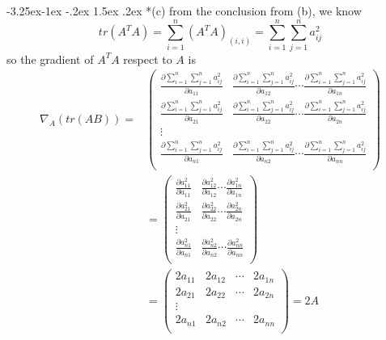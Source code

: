 \documentclass[12pt]{article}
\makeatletter
\renewcommand\subsection{\@startsection{subsection}{2}{\z@}%
	{-3.25ex\@plus -1ex \@minus -.2ex}%
	{1.5ex \@plus .2ex}%
	{\normalfont\large\bfseries}}%
\makeatother
\begin{document}
	\subsection*{(c)}
	from the conclusion from (b), we know
	\begin{equation}\label{aa_ii}
	tr(A^TA)=\sum_{i=1}^n (A^TA)_{(i,i)}=\sum_{i=1}^n\sum_{j=1}^n a_{ij}^2
	\end{equation}
	so the gradient of $A^TA$ respect to $A$ is
	\begin{equation}\label{trAA_grad}
	\begin{split}
	\nabla_A(tr(AB))=&
	\left(  
	\begin{array}{cccc}
	\frac{\partial\sum_{i=1}^n\sum_{j=1}^n a_{ij}^2}{\partial a_{11}} & \frac{\partial\sum_{i=1}^n\sum_{j=1}^n a_{ij}^2}{\partial a_{12}} \cdots \frac{\partial\sum_{i=1}^n\sum_{j=1}^n a_{ij}^2}{\partial a_{1n}}\\
	\frac{\partial\sum_{i=1}^n\sum_{j=1}^n a_{ij}^2}{\partial a_{21}} & \frac{\partial\sum_{i=1}^n\sum_{j=1}^n a_{ij}^2}{\partial a_{22}} \cdots \frac{\partial\sum_{i=1}^n\sum_{j=1}^n a_{ij}^2}{\partial a_{2n}}\\
	\vdots \\
	\frac{\partial\sum_{i=1}^n\sum_{j=1}^n a_{ij}^2}{\partial a_{n1}} & \frac{\partial\sum_{i=1}^n\sum_{j=1}^n a_{ij}^2}{\partial a_{n2}} \cdots \frac{\partial\sum_{i=1}^n\sum_{j=1}^n a_{ij}^2}{\partial a_{nn}}\\	
	\end{array}
	\right)\\
	&=
	\left(  
	\begin{array}{cccc}
	\frac{\partial a_{11}^2}{\partial a_{11}} & \frac{\partial a_{12}^2}{\partial a_{12}} \cdots \frac{\partial a_{1n}^2}{\partial a_{1n}}\\
	\frac{\partial a_{21}^2}{\partial a_{21}} & \frac{\partial a_{22}^2}{\partial a_{22}} \cdots \frac{\partial a_{2n}^2}{\partial a_{2n}}\\
	\vdots \\
	\frac{\partial a_{n1}^2}{\partial a_{n1}} & \frac{\partial a_{n2}^2}{\partial a_{n2}} \cdots \frac{\partial a_{nn}^2}{\partial a_{nn}}\\	
	\end{array}
	\right)\\
	&=
	\left(
	\begin{array}{cccc}	
	2a_{11} & 2a_{12} & \cdots & 2a_{1n}\\
	2a_{21} & 2a_{22} & \cdots & 2a_{2n}\\
	\vdots \\
	2a_{n1} & 2a_{n2} & \cdots & 2a_{nn}\\
	\end{array}
	\right)
	=2A
	\end{split}
	\end{equation}
	
\end{document}
